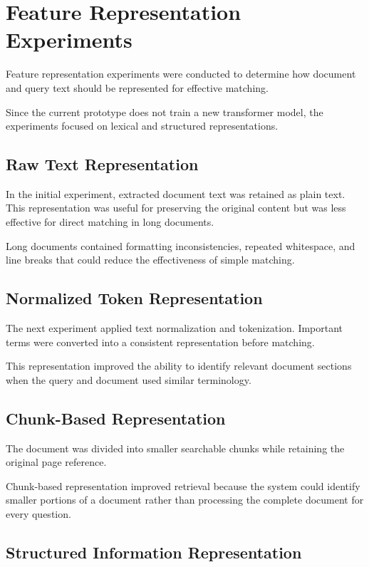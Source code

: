 \section{Feature Representation Experiments}

Feature representation experiments were conducted to determine how
document and query text should be represented for effective matching.

Since the current prototype does not train a new transformer model,
the experiments focused on lexical and structured representations.

\subsection{Raw Text Representation}

In the initial experiment, extracted document text was retained as
plain text. This representation was useful for preserving the original
content but was less effective for direct matching in long documents.

Long documents contained formatting inconsistencies, repeated
whitespace, and line breaks that could reduce the effectiveness of
simple matching.

\subsection{Normalized Token Representation}

The next experiment applied text normalization and tokenization.
Important terms were converted into a consistent representation before
matching.

This representation improved the ability to identify relevant
document sections when the query and document used similar terminology.

\subsection{Chunk-Based Representation}

The document was divided into smaller searchable chunks while
retaining the original page reference.

Chunk-based representation improved retrieval because the system could
identify smaller portions of a document rather than processing the
complete document for every question.

\subsection{Structured Information Representation}

